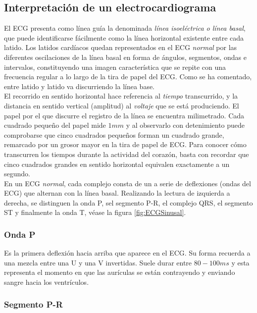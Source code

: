 \documentclass[spanish,11pt,letterpaper,oneside]{memoir}
\begin{document}
\subsection{Interpretación de un electrocardiograma}

El ECG presenta como línea guía la denominada \textit{línea isoeléctrica o línea basal}, que puede identificarse fácilmente como la línea horizontal existente entre cada latido. Los latidos cardíacos quedan representados en el ECG \textit{normal} por las diferentes oscilaciones de la línea basal en forma de ángulos, segmentos, ondas e intervalos, constituyendo una imagen característica que se repite con una frecuencia regular a lo largo de la tira de papel del ECG. Como se ha comentado, entre latido y latido va discurriendo la línea base. \\
El recorrido en sentido horizontal hace referencia al \textit{tiempo} transcurrido, y la distancia en sentido vertical (amplitud) al \textit{voltaje} que se está produciendo. El papel por el que discurre el registro de la línea se encuentra milimetrado. Cada cuadrado pequeño del papel mide $1 mm$ y al observarlo con detenimiento puede comprobarse que cinco cuadrados pequeños forman un cuadrado grande, remarcado por un grosor mayor en la tira de papel de ECG. Para conocer cómo transcurren los tiempos durante la actividad del corazón, basta con recordar que cinco cuadrados grandes en sentido horizontal equivalen exactamente a un segundo. \\
En un ECG \textit{normal}, cada complejo consta de un a serie de deflexiones (ondas del ECG) que alternan con la línea basal. Realizando la lectura de izquierda a derecha, se distinguen la onda P, sel segmento P-R, el complejo QRS, el segmento ST y finalmente la onda T, véase la figura \ref{fig:ECGSinusal}. \\

\subsubsection{Onda P}

Es la primera deflexión hacia arriba que aparece en el ECG. Su forma recuerda a una mezcla entre una U y una V invertidas. Suele durar entre $80-100 ms$ y esta representa el momento en que las aurículas se están contrayendo y enviando sangre hacia los ventrículos. 

\subsubsection{Segmento P-R}
\end{document}
